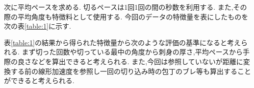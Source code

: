 次に平均ペースを求める.
切るペースは1回1回の間の秒数を利用する.
また,その際の平均角度も特徴料として使用する.
今回のデータの特徴量を表にしたものを次の表\ref{table:1}に示す.
\begin{table}[ht]
    \centering
    \caption{特徴量}
    \label{table:1}
\end{table}
表\ref{table:1}の結果から得られた特徴量から次のような評価の基準になると考えられる.
まず切った回数や切っている最中の角度から刺身の厚さ,平均ペースから手際の良さなどを算出できると考えられる.
また,今回は参照していないが距離に変換する前の線形加速度を参照し一回の切り込み時の包丁のブレ等も算出することができると考えられる.

